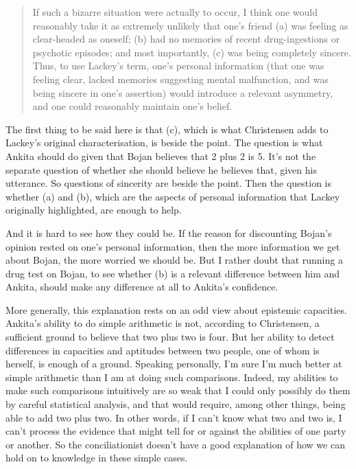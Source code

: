\begin{quote}
If such a bizarre situation were actually to occur, I think one would reasonably take it as extremely unlikely that one's friend (a) was feeling as clear-headed as oneself; (b) had no memories of recent drug-ingestions or psychotic episodes; and most importantly, (c) was being completely sincere. Thus, to use Lackey's term, one's personal information (that one was feeling clear, lacked memories suggesting mental malfunction, and was being sincere in one's assertion) would introduce a relevant asymmetry, and one could reasonably maintain one's belief.
\end{quote}
The first thing to be said here is that (c), which is what Christensen adds to Lackey's original characterisation, is beside the point. The question is what \gls{Ankita} should do given that \gls{Bojan} believes that 2 plus 2 is 5. It's not the separate question of whether she should believe he believes that, given his utterance. So questions of sincerity are beside the point. Then the question is whether (a) and (b), which are the aspects of personal information that Lackey originally highlighted, are enough to help.

And it is hard to see how they could be. If the reason for discounting \gls{Bojan}'s opinion rested on one's personal information, then the more information we get about \gls{Bojan}, the more worried we should be. But I rather doubt that running a drug test on \gls{Bojan}, to see whether (b) is a relevant difference between him and \gls{Ankita}, should make any difference at all to \gls{Ankita}'s confidence.

More generally, this explanation rests on an odd view about epistemic capacities. \gls{Ankita}'s ability to do simple arithmetic is not, according to Christensen, a sufficient ground to believe that two plus two is four. But her ability to detect differences in capacities and aptitudes between two people, one of whom is herself, is enough of a ground. Speaking personally, I'm sure I'm much better at simple arithmetic than I am at doing such comparisons. Indeed, my abilities to make such comparisons intuitively are so weak that I could only possibly do them by careful statistical analysis, and that would require, among other things, being able to add two plus two. In other words, if I can't know what two and two is, I can't process the evidence that might tell for or against the abilities of one party or another. So the conciliationist doesn't have a good explanation of how we can hold on to knowledge in these simple cases.

